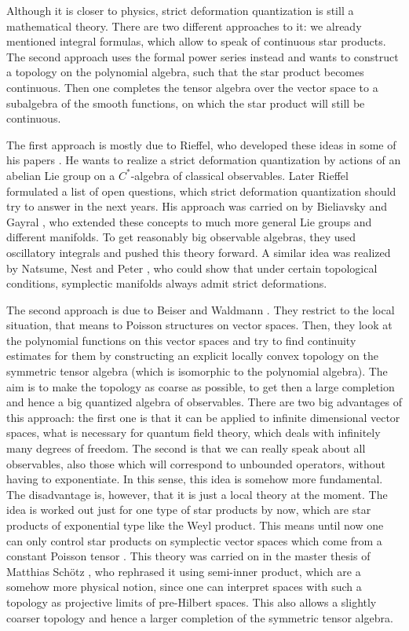 Although it is closer to physics, strict deformation quantization is still a 
mathematical theory. There are two different approaches to it: we 
already mentioned integral formulas, which allow to speak of continuous star 
products. The second approach uses the formal power series instead and wants to 
construct a topology on the polynomial algebra, such that the star product becomes 
continuous. Then one completes the tensor algebra over the vector space to a 
subalgebra of the smooth functions, on which the star product will still be 
continuous.


The first approach is mostly due to Rieffel, who developed these ideas in some of 
his papers \cite{rieffel:1989a, rieffel:1990c, rieffel:1993a}. He wants to 
realize a strict deformation quantization by actions of an abelian Lie group on a 
$C^*$-algebra of classical observables. Later Rieffel formulated a list of open 
questions, which strict deformation quantization should try to answer 
\cite{rieffel:1998a} in the next years. His approach was carried on by Bieliavsky 
and Gayral \cite{bieliavsky:2002a, bieliavsky.gayral:2015a}, who extended these 
concepts to much more general Lie groups and different manifolds. To get 
reasonably big observable algebras, they used oscillatory integrals and pushed 
this theory forward. A similar idea was realized by Natsume, Nest and 
Peter \cite{natsume.nest.peter:2003a}, who could show that under certain 
topological conditions, symplectic manifolds always admit strict deformations.


The second approach is due to Beiser and Waldmann 
\cite{beiser:2011a, beiser.waldmann:2014a, waldmann:2014a}. They restrict to the 
local situation, that means to Poisson structures on vector spaces. Then, they 
look at the polynomial functions on this vector spaces and try to find 
continuity estimates for them by constructing an explicit locally convex 
topology on the symmetric tensor algebra (which is isomorphic to the polynomial 
algebra). The aim is to make the topology as coarse as possible, to get then a 
large completion and hence a big quantized algebra of 
observables. There are two big advantages of this approach: the first one is 
that it can be applied to infinite dimensional vector spaces, what is necessary 
for quantum field theory, which deals with infinitely many degrees of freedom. 
The second is that we can really speak about all observables, also those 
which will correspond to unbounded operators, without having to exponentiate. In 
this sense, this idea is somehow more fundamental. The disadvantage is, however, 
that it is just a local theory at the moment. The idea is worked out just for 
one type of star products by now, which are star products of exponential type like 
the Weyl product. This means until now one can only control star products on 
symplectic vector spaces which come from a constant Poisson tensor 
\cite{waldmann:2014a}. This theory was carried on in the master thesis of Matthias 
Sch\"otz \cite{schoetz:2014a}, who rephrased it using semi-inner product, which 
are a somehow more physical notion, since one can interpret spaces with such a 
topology as projective limits of pre-Hilbert spaces. This also allows a slightly 
coarser topology and hence a larger completion of the symmetric tensor algebra.


